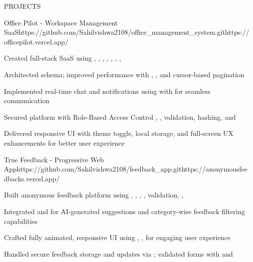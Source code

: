 \documentclass{resume}
\begin{document}
\begin{rSection}{PROJECTS}

\begin{rProject}{Office Pilot - Workspace Management SaaS}{https://github.com/Sahilvishwa2108/office_management_system.git}{https://officepilot.vercel.app/}
\item Created full-stack SaaS using , , , , , , , 
\item Architected  schema; improved performance with , , and cursor-based pagination
\item Implemented real-time chat and notifications using  with  for seamless communication
\item Secured platform with Role-Based Access Control , ,  validation,  hashing, and 
\item Delivered responsive UI with theme toggle, local storage, and full-screen UX enhancements for better user experience
\end{rProject}

\begin{rProject}{True Feedback - Progressive Web App}{https://github.com/Sahilvishwa2108/feedback_app.git}{https://anonymousfeedbacks.vercel.app/}
\item Built anonymous feedback platform using , , , ,  validation, , 
\item Integrated  and  for AI-generated suggestions and category-wise feedback filtering capabilities
\item Crafted fully animated, responsive UI using , ,  for engaging user experience
\item Handled secure feedback storage and updates via ; validated forms with  and 
\end{rProject}


\end{rSection}
\end{document}
